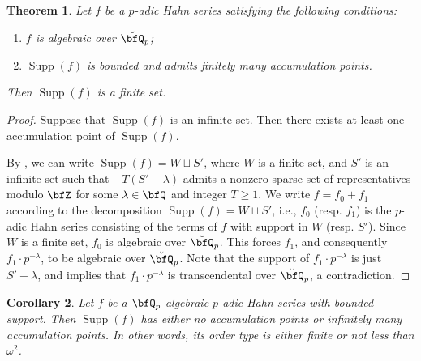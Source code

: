 \documentclass[english,oneside]{smfart}
\newcommand{\opn}[1]{\operatorname{#1}}
\newtheorem{theorem}{Theorem}[section]
\newtheorem{corollary}[theorem]{Corollary}
\begin{document}
\begin{theorem}\label{thm:29075}
    Let $f$ be a $p$-adic Hahn series satisfying the following conditions:
    \begin{enumerate}
        \item $f$ is algebraic over $\breve{\bfQ}_p$;
        \item $\opn{Supp}(f)$ is bounded and admits finitely many accumulation points.
    \end{enumerate}
    Then $\opn{Supp}(f)$ is a finite set.
\end{theorem}
\begin{proof}
    Suppose that $\opn{Supp}(f)$ is an infinite set. Then there exists at least one accumulation point of $\opn{Supp}(f)$.

    By , we can write $\opn{Supp}(f)=W\sqcup S'$, where $W$ is a finite set, and $S'$ is an infinite set such that $-T(S'-\lambda)$ admits a nonzero sparse set of representatives modulo $\bfZ$ for some $\lambda\in\bfQ$ and integer $T\geq 1$. We write $f=f_0+f_1$ according to the decomposition $\opn{Supp}(f)=W\sqcup S'$, i.e., $f_0$ (resp. $f_1$) is the $p$-adic Hahn series consisting of the terms of $f$ with support in $W$ (resp. $S'$). Since $W$ is a finite set, $f_0$ is algebraic over $\breve{\bfQ}_p$. This forces $f_1$, and consequently $f_1\cdot p^{-\lambda}$, to be algebraic over $\breve{\bfQ}_p$. Note that the support of $f_1\cdot p^{-\lambda}$ is just $S'-\lambda$, and  implies that $f_1\cdot p^{-\lambda}$ is transcendental over $\breve{\bfQ}_p$, a contradiction.
\end{proof}

\begin{corollary}\label{coro:11594}
    Let $f$ be a $\bfQ_p$-algebraic $p$-adic Hahn series with bounded support. Then $\opn{Supp}(f)$ has either no accumulation points or infinitely many accumulation points. In other words, its order type is either finite or not less than $\omega^2$.
\end{corollary}
\end{document}
